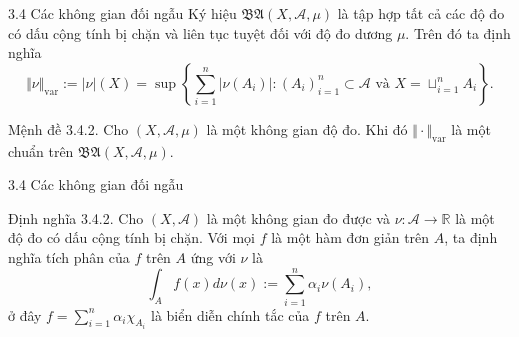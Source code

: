 \documentclass[notheorems,envcountsect,hyperref=unicode]{beamer}
\newcommand{\R}{\mathbb R}
\def\A{\mathcal{A}}
\def\R{\mathbb{R}}
\def\disint{\displaystyle\int}
\def\dissum{\displaystyle\sum}
\def\kgdd{(X,\A,\mu)}
\begin{document}
\begin{frame}{3.4 Các không gian đối ngẫu }
Ký hiệu $\mathfrak{BA}\kgdd$ là tập hợp tất cả các độ đo có dấu cộng tính bị chặn và liên tục tuyệt đối với độ đo dương $\mu$. Trên đó ta định nghĩa
$$\Vert \nu\Vert_{\text{var}}:=\vert \nu\vert(X)=\sup \left\lbrace \dissum_{i=1}^n \vert \nu(A_i)\vert: (A_i)_{i=1}^n\subset\A \text{ và }X=\sqcup_{i=1}^n A_i\right\rbrace.$$

\begin{block}{\textnormal{Mệnh đề 3.4.2.}}
Cho $\kgdd$ là một không gian độ đo. Khi đó $\Vert \cdot\Vert_{\text{var}}$ là một chuẩn trên $\mathfrak{BA}\kgdd$.
\end{block}
\end{frame}

\begin{frame}{3.4 Các không gian đối ngẫu }
\begin{block}{\textnormal{Định nghĩa 3.4.2.}}
Cho $(X,\A)$ là một không gian đo được và $\nu: \A \to \R$ là một độ đo có dấu cộng tính bị chặn. Với mọi $f$ là một hàm đơn giản trên $A$, ta định nghĩa tích phân của $f$ trên $A$ ứng với $\nu$ là
$$\disint_A f(x)d\nu(x):=\dissum_{i=1}^n \alpha_i\nu(A_i),$$
ở đây $f=\dissum_{i=1}^n \alpha_i\chi_{A_i}$ là biển diễn chính tắc của $f$ trên $A$.
\end{block}
\end{frame}

\end{document}
